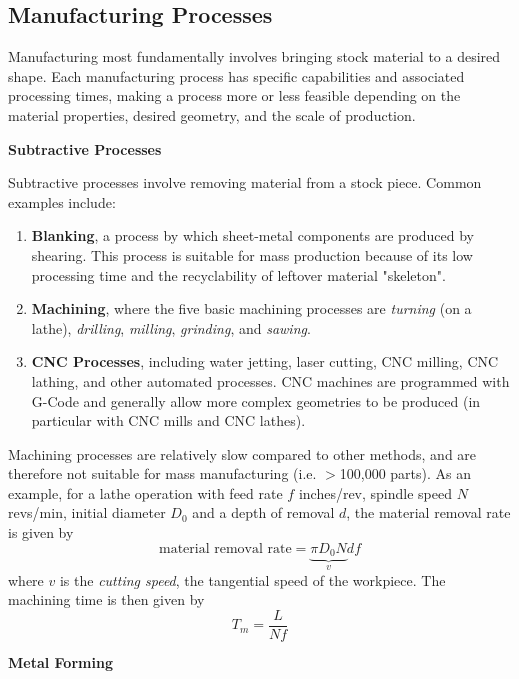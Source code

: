 \subsection{Manufacturing Processes}

Manufacturing most fundamentally involves bringing stock material to a desired shape. Each manufacturing process has specific capabilities and associated processing times, making a process more or less feasible depending on the material properties, desired geometry, and the scale of production. 

\textbf{Subtractive Processes}

Subtractive processes involve removing material from a stock piece. Common examples include:
\begin{enumerate}
    \item[] \textbf{Blanking}, a process by which sheet-metal components are produced by shearing. This process is suitable for mass production because of its low processing time and the recyclability of leftover material "skeleton".
    \item[] \textbf{Machining}, where the five basic machining processes are \textit{turning} (on a lathe), \textit{drilling}, \textit{milling}, \textit{grinding}, and \textit{sawing}.
    \item[] \textbf{CNC Processes}, including water jetting, laser cutting, CNC milling, CNC lathing, and other automated processes. CNC machines are programmed with G-Code and generally allow more complex geometries to be produced (in particular with CNC mills and CNC lathes).
\end{enumerate}
Machining processes are relatively slow compared to other methods, and are therefore not suitable for mass manufacturing (i.e. $>$100,000 parts). As an example, for a lathe operation with feed rate $f$ inches/rev, spindle speed $N$ revs/min, initial diameter $D_0$ and a depth of removal $d$, the material removal rate is given by \[\text{material removal rate} = \underbrace{\pi D_0 N}_{v} d f\] where $v$ is the \textit{cutting speed}, the tangential speed of the workpiece. The machining time is then given by \[T_m = \frac{L}{Nf}\]

\textbf{Metal Forming}

